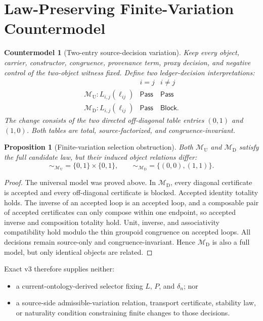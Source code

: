 \documentclass[11pt]{article}
\newtheorem{proposition}{Proposition}
\newtheorem{countermodel}{Countermodel}
\newcommand{\Pass}{\mathsf{Pass}}
\newcommand{\Block}{\mathsf{Block}}
\begin{document}
\section{Law-Preserving Finite-Variation Countermodel}

\begin{countermodel}[Two-entry source-decision variation]
Keep every object, carrier, constructor, congruence, provenance term,
proxy decision, and negative control of the two-object witness fixed.
Define two ledger-decision interpretations:
\[
\begin{array}{c|cc}
 & i=j & i\ne j\\
\hline
\mathcal M_{\mathrm U}:L_{i,j}(\ell_{ij}) & \Pass & \Pass\\
\mathcal M_{\mathrm D}:L_{i,j}(\ell_{ij}) & \Pass & \Block .
\end{array}
\]
The change consists of the two directed off-diagonal table entries
\((0,1)\) and \((1,0)\). Both tables are total, source-factorized, and
congruence-invariant.
\end{countermodel}

\begin{proposition}[Finite-variation selection obstruction]
Both \(\mathcal M_{\mathrm U}\) and \(\mathcal M_{\mathrm D}\) satisfy the
full candidate law, but their induced object relations differ:
\[
 \sim_{\mathcal M_{\mathrm U}}=\{0,1\}\times\{0,1\},
 \qquad
 \sim_{\mathcal M_{\mathrm D}}=\{(0,0),(1,1)\}.
\]
\end{proposition}

\begin{proof}
The universal model was proved above. In \(\mathcal M_{\mathrm D}\), every
diagonal certificate is accepted and every off-diagonal certificate is
blocked. Accepted identity totality holds. The inverse of an accepted loop is
an accepted loop, and a composable pair of accepted certificates can only
compose within one endpoint, so accepted inverse and composition totality
hold. Unit, inverse, and associativity compatibility hold modulo the thin
groupoid congruence on accepted loops. All decisions remain source-only and
congruence-invariant. Hence \(\mathcal M_{\mathrm D}\) is also a full model,
but only identical objects are related.
\end{proof}

Exact v3 therefore supplies neither:
\begin{itemize}[leftmargin=*]
  \item a current-ontology-derived selector fixing \(L\), \(P\), and
  \(\delta_n\); nor
  \item a source-side admissible-variation relation, transport certificate,
  stability law, or naturality condition constraining finite changes to those
  decisions.
\end{itemize}
\end{document}
